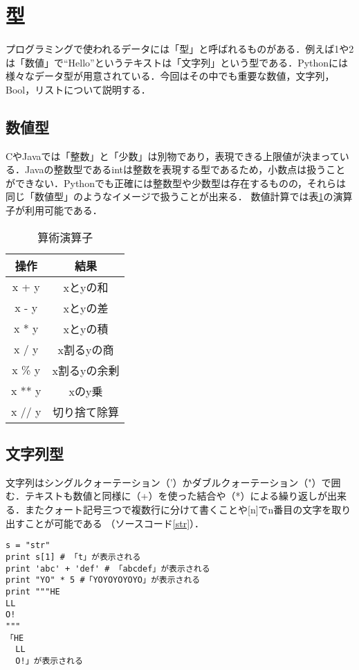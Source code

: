 
\section{型}
プログラミングで使われるデータには「型」と呼ばれるものがある．例えば1や2は「数値」で``Hello''というテキストは「文字列」という型である．Pythonには様々なデータ型が用意されている．今回はその中でも重要な数値，文字列，Bool，リストについて説明する．
\subsection{数値型}
CやJavaでは「整数」と「少数」は別物であり，表現できる上限値が決まっている．Javaの整数型であるintは整数を表現する型であるため，小数点は扱うことができない．Pythonでも正確には整数型や少数型は存在するものの，それらは同じ「数値型」のようなイメージで扱うことが出来る．
数値計算では表\ref{arithmetic_operator}の演算子が利用可能である．

\begin{table}[h]
\centering
 \caption{算術演算子}
  \begin{tabular}{|c|c|} \hline
    操作 & 結果  \\ \hline \hline
    x + y & xとyの和 \\ \hline
    x - y & xとyの差 \\ \hline
    x * y & xとyの積 \\ \hline
    x / y & x割るyの商 \\ \hline
    x \% y & x割るyの余剰 \\ \hline
    x ** y & xのy乗 \\ \hline
    x // y & 切り捨て除算 \\ \hline
  \end{tabular} 
 \label{arithmetic_operator}
\end{table}

\subsection{文字列型}
文字列はシングルクォーテーション（'）かダブルクォーテーション（"）で囲む．テキストも数値と同様に（+）を使った結合や（*）による繰り返しが出来る．またクォート記号三つで複数行に分けて書くことや[n]でn番目の文字を取り出すことが可能である （ソースコード\ref{str}）．
\begin{lstlisting}[caption=文字列の操作, label=str]
s = "str"
print s[1] # 「t」が表示される
print 'abc' + 'def' # 「abcdef」が表示される
print "YO" * 5 #「YOYOYOYOYO」が表示される 
print """HE
LL
O!
"""
「HE
  LL
  O!」が表示される
\end{lstlisting}

